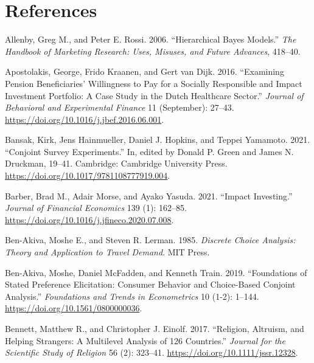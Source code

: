 \documentclass[
  12pt,
]{article}
\newlength{\cslhangindent}
\newlength{\cslentryspacingunit} %
\newenvironment{CSLReferences}[2] %
 {%
  \setlength{\parindent}{0pt}
  \ifodd #1
  \let\oldpar\par
  \def\par{\hangindent=\cslhangindent\oldpar}
  \fi
  \setlength{\parskip}{#2\cslentryspacingunit}
 }%
 {}
\begin{document}
\hypertarget{references}{%
\section*{References}\label{references}}

\hypertarget{refs}{}
\begin{CSLReferences}{1}{0}
\leavevmode{}%
Allenby, Greg M., and Peter E. Rossi. 2006. {``Hierarchical Bayes Models.''} \emph{The Handbook of Marketing Research: Uses, Misuses, and Future Advances}, 418--40.

\leavevmode{}%
Apostolakis, George, Frido Kraanen, and Gert van Dijk. 2016. {``Examining Pension Beneficiaries{'} Willingness to Pay for a Socially Responsible and Impact Investment Portfolio: A Case Study in the Dutch Healthcare Sector.''} \emph{Journal of Behavioral and Experimental Finance} 11 (September): 27--43. \url{https://doi.org/10.1016/j.jbef.2016.06.001}.

\leavevmode{}%
Bansak, Kirk, Jens Hainmueller, Daniel J. Hopkins, and Teppei Yamamoto. 2021. {``Conjoint Survey Experiments.''} In, edited by Donald P. Green and James N. Druckman, 19--41. Cambridge: Cambridge University Press. \url{https://doi.org/10.1017/9781108777919.004}.

\leavevmode{}%
Barber, Brad M., Adair Morse, and Ayako Yasuda. 2021. {``Impact Investing.''} \emph{Journal of Financial Economics} 139 (1): 162--85. \url{https://doi.org/10.1016/j.jfineco.2020.07.008}.

\leavevmode{}%
Ben-Akiva, Moshe E., and Steven R. Lerman. 1985. \emph{Discrete Choice Analysis: Theory and Application to Travel Demand}. MIT Press.

\leavevmode{}%
Ben-Akiva, Moshe, Daniel McFadden, and Kenneth Train. 2019. {``Foundations of Stated Preference Elicitation: Consumer Behavior and Choice-Based Conjoint Analysis.''} \emph{Foundations and Trends in Econometrics} 10 (1-2): 1--144. \url{https://doi.org/10.1561/0800000036}.

\leavevmode{}%
Bennett, Matthew R., and Christopher J. Einolf. 2017. {``Religion, Altruism, and Helping Strangers: A Multilevel Analysis of 126 Countries.''} \emph{Journal for the Scientific Study of Religion} 56 (2): 323--41. \url{https://doi.org/10.1111/jssr.12328}.


\end{CSLReferences}
\end{document}
